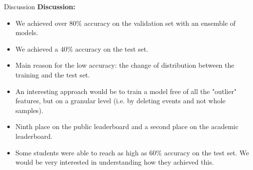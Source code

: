 \documentclass{beamer}
\begin{document}
\begin{frame}{Discussion}
    \textbf{Discussion:}
    \begin{itemize}
        \item We achieved over $80\%$ accuracy on the validation set with an ensemble of models.
        \item We achieved a $40\%$ accuracy on the test set.
        \item Main reason for the low accuracy: the change of distribution between the training and the test set.
        \item An interesting approach would be to train a model free of all the "outlier" features, but on a granular level (i.e. by deleting events and not whole samples).
        \item Ninth place on the public leaderboard and a second place on the academic leaderboard.
        \item Some students were able to reach as high as $60\%$ accuracy on the test set. We would be very interested in understanding how they achieved this.
    \end{itemize}
\end{frame}
\end{document}
